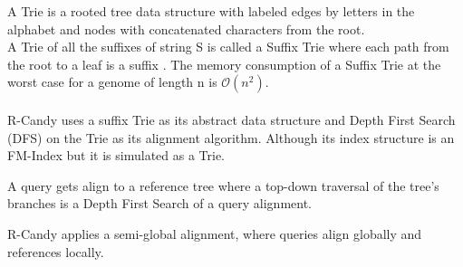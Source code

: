 \documentclass[11pt,a4paper]{report}
\begin{document}
A Trie is a rooted tree data structure with labeled edges 
by letters in the alphabet and nodes with concatenated 
characters from the root\cite{trie}.\\ 
A Trie of all the suffixes of string S is called a Suffix 
Trie where each path from the root to a leaf is a suffix 
\cite{gusfield1997algorithms}.
The memory consumption of a Suffix Trie at the worst case 
for a genome of length n is  $\mathcal{O} (n^{2})$.
\\\\

R-Candy uses a suffix Trie as its abstract data structure
and  Depth First Search (DFS) on the Trie as its alignment algorithm.
Although its index structure is an FM-Index 
but it is simulated as a Trie.

A query gets align to a reference tree where a 
 top-down traversal of the tree's branches is a Depth
First Search of a query alignment.

R-Candy applies a semi-global alignment, where queries 
align globally and  references locally.
\end{document}

